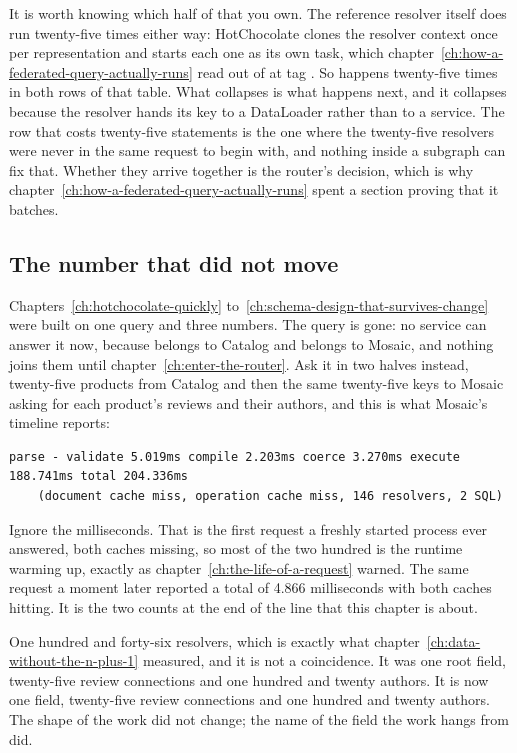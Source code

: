 It is worth knowing which half of that you own. The reference resolver itself
does run twenty-five times either way: HotChocolate clones the resolver context
once per representation and starts each one as its own task, which
chapter~\ref{ch:how-a-federated-query-actually-runs} read out of
 at tag . So 
happens twenty-five times in both rows of that table. What collapses is what
happens next, and it collapses because the resolver hands its key to a
DataLoader rather than to a service. The row that costs twenty-five statements
is the one where the twenty-five resolvers were never in the same request to
begin with, and nothing inside a subgraph can fix that. Whether they arrive
together is the router's decision, which is why
chapter~\ref{ch:how-a-federated-query-actually-runs} spent a section proving
that it batches.

\subsection*{The number that did not move}

%
Chapters~\ref{ch:hotchocolate-quickly} to~\ref{ch:schema-design-that-survives-change}
were built on one query and three numbers. The query is gone: no service can
answer it now, because  belongs to Catalog and 
belongs to Mosaic, and nothing joins them until
chapter~\ref{ch:enter-the-router}. Ask it in two halves instead, twenty-five
products from Catalog and then the same twenty-five keys to Mosaic asking for
each product's reviews and their authors, and this is what Mosaic's timeline
reports:

\begin{verbatim}
parse - validate 5.019ms compile 2.203ms coerce 3.270ms execute 188.741ms total 204.336ms
    (document cache miss, operation cache miss, 146 resolvers, 2 SQL)
\end{verbatim}

Ignore the milliseconds. That is the first request a freshly started process
ever answered, both caches missing, so most of the two hundred is the runtime
warming up, exactly as chapter~\ref{ch:the-life-of-a-request} warned. The same
request a moment later reported a total of 4.866 milliseconds with both caches
hitting. It is the two counts at the end of the line that this chapter is
about.

%
One hundred and forty-six resolvers, which is exactly what
chapter~\ref{ch:data-without-the-n-plus-1} measured, and it is not a
coincidence. It was one root field, twenty-five review connections and one
hundred and twenty authors. It is now one  field, twenty-five
review connections and one hundred and twenty authors. The shape of the work did
not change; the name of the field the work hangs from did.

